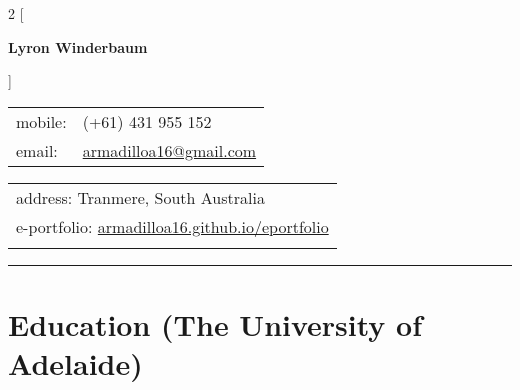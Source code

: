 \documentclass[a4paper,12pt]{report}
\begin{document}
 

\begin{multicols}{2}
[
\begin{center}
{\Large \textbf{Lyron Winderbaum}} \\ \vspace{4mm}
\end{center}
]

\begin{flushleft}
\begin{tabular}{ll}
mobile: & (+61) 431 955 152 \\
email: & \href{mailto:armadilloa16@gmail.com}{armadilloa16@gmail.com} \\
\end{tabular}
\end{flushleft}

\begin{flushright}
\begin{tabular}{l}
address: Tranmere, South Australia \\
e-portfolio: \href{https://armadilloa16.github.io/eportfolio/}{armadilloa16.github.io/eportfolio} \\ 
{}
\end{tabular}
\end{flushright}
\end{multicols}                                  

\vspace{-0.4cm}
\hrule
\vspace{-0.2cm}

%

\section*{Education (The University of Adelaide)}
\end{document}
